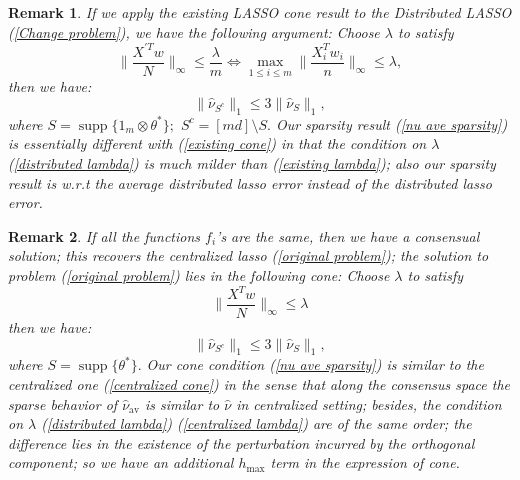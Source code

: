 \documentclass{article}
\theoremstyle{break}
\newtheorem*{remark}{Remark}
\newcommand{\T}{\theta}
\DeclareMathOperator\supp{supp}
\begin{document}
\begin{remark}
If we apply the existing LASSO cone result to the Distributed LASSO (\ref{Change problem}), we have the following argument: Choose $\lambda$ to satisfy 
\begin{equation}\label{existing lambda}
\lVert\frac{X^{'T} w}{N}\rVert_{\infty}\leq\frac{\lambda}{m}\Leftrightarrow \max\limits_{1\leq i\leq m}\lVert\frac{X_i^T w_i}{n}\rVert_{\infty}\leq\lambda,
\end{equation} then we have:
\begin{equation}\label{existing cone}
    \lVert\hat{\nu}_{S^c}\rVert_1\leq 3\lVert\hat{\nu}_{S}\rVert_1,
\end{equation}
where $ S=\supp\{1_m\otimes\T^*\};$ $S^c=[m d]\setminus S.$ 
Our sparsity result (\ref{nu ave sparsity}) is essentially different with (\ref{existing cone}) in that the condition on $\lambda$ (\ref{distributed lambda}) is much milder than (\ref{existing lambda}); also our sparsity result is w.r.t the average distributed lasso error instead of the distributed lasso error.
\end{remark}
\begin{remark}
If all the functions $f_i$'s are the same, then we have a consensual solution; this recovers the centralized lasso (\ref{original problem}); the solution to problem (\ref{original problem}) lies in the following cone:
Choose $\lambda$ to satisfy 
\begin{equation}\label{centralized lambda}
\lVert\frac{X^{T} w}{N}\rVert_{\infty}\leq\lambda
\end{equation} then we have:
\begin{equation}\label{centralized cone}
    \lVert\hat{\nu}_{S^c}\rVert_1\leq 3\lVert\hat{\nu}_{S}\rVert_1,
\end{equation}
where $S=\supp\{\T^*\}.$ Our cone condition (\ref{nu ave sparsity}) is similar to the centralized one (\ref{centralized cone}) in the sense that along the consensus space the sparse behavior of $\hat{\nu}_{\text{av}}$ is similar to $\hat{\nu}$ in centralized setting; besides, the condition on $\lambda$ (\ref{distributed lambda}) (\ref{centralized lambda}) are of the same order; the difference lies in the existence of the perturbation incurred by the orthogonal component; so we have an additional $h_{\max}$ term in the expression of cone.
\end{remark}
\end{document}
